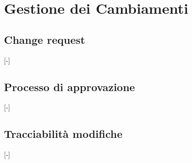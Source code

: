 \section{Gestione dei Cambiamenti}

\subsection{Change request}
[-]

\subsection{Processo di approvazione}
[-]

\subsection{Tracciabilità modifiche}
[-]